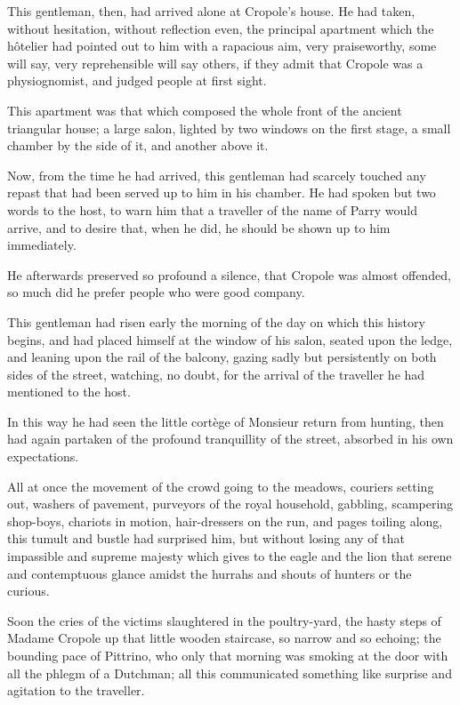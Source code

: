 This gentleman, then, had arrived alone at Cropole's house. He had taken, without hesitation, without reflection even, the principal apartment which the hôtelier had pointed out to him with a rapacious aim, very praiseworthy, some will say, very reprehensible will say others, if they admit that Cropole was a physiognomist, and judged people at first sight.

This apartment was that which composed the whole front of the ancient triangular house; a large salon, lighted by two windows on the first stage, a small chamber by the side of it, and another above it.

Now, from the time he had arrived, this gentleman had scarcely touched any repast that had been served up to him in his chamber. He had spoken but two words to the host, to warn him that a traveller of the name of Parry would arrive, and to desire that, when he did, he should be shown up to him immediately.

He afterwards preserved so profound a silence, that Cropole was almost offended, so much did he prefer people who were good company.

This gentleman had risen early the morning of the day on which this history begins, and had placed himself at the window of his salon, seated upon the ledge, and leaning upon the rail of the balcony, gazing sadly but persistently on both sides of the street, watching, no doubt, for the arrival of the traveller he had mentioned to the host.

In this way he had seen the little cortège of Monsieur return from hunting, then had again partaken of the profound tranquillity of the street, absorbed in his own expectations.

All at once the movement of the crowd going to the meadows, couriers setting out, washers of pavement, purveyors of the royal household, gabbling, scampering shop-boys, chariots in motion, hair-dressers on the run, and pages toiling along, this tumult and bustle had surprised him, but without losing any of that impassible and supreme majesty which gives to the eagle and the lion that serene and contemptuous glance amidst the hurrahs and shouts of hunters or the curious.

Soon the cries of the victims slaughtered in the poultry-yard, the hasty steps of Madame Cropole up that little wooden staircase, so narrow and so echoing; the bounding pace of Pittrino, who only that morning was smoking at the door with all the phlegm of a Dutchman; all this communicated something like surprise and agitation to the traveller.

